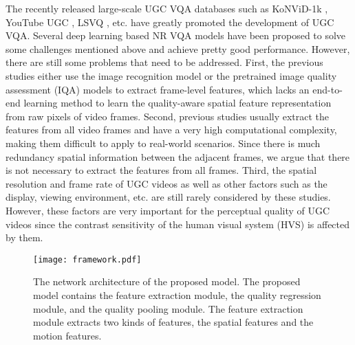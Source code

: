 \documentclass[sigconf]{acmart}
\begin{document}
The recently released large-scale UGC VQA databases such as KoNViD-1k \cite{hosu2017konstanz}, YouTube UGC \cite{wang2019youtube}, LSVQ \cite{ying2021patch}, etc. have greatly promoted the development of UGC VQA. Several deep learning based NR VQA models \cite{li2019quality,ying2021patch,wang2021rich,xu2021perceptual,li2021blindly} have been proposed to solve some challenges mentioned above and achieve pretty good performance. However, there are still some problems that need to be addressed. First, the previous studies either use the image recognition model \cite{li2019quality}\cite{ying2021patch} or the pretrained image quality assessment (IQA) models \cite{wang2021rich}\cite{xu2021perceptual}\cite{li2021blindly} to extract frame-level features, which lacks an end-to-end learning method to learn the quality-aware spatial feature representation from raw pixels of video frames. 
Second, previous studies usually extract the features from all video frames and have a very high computational complexity, making them difficult to apply to real-world scenarios. Since there is much redundancy spatial information between the adjacent frames, we argue that there is not necessary to extract the features from all frames. Third, the spatial resolution and frame rate of UGC videos as well as other factors such as the display, viewing environment, etc. are still rarely considered by these studies. However, these factors are very important for the perceptual quality of UGC videos since the contrast sensitivity of the human visual system (HVS) is affected by them.




















\begin{figure*}[!t]
	\centering
	\texttt{[image: framework.pdf]}
	\caption{The network architecture of the proposed model. The proposed model contains the feature extraction module, the quality regression module, and the quality pooling module. The feature extraction module extracts two kinds of features, the spatial features and the motion features.}
	\label{model_framework}
\end{figure*}
\end{document}
